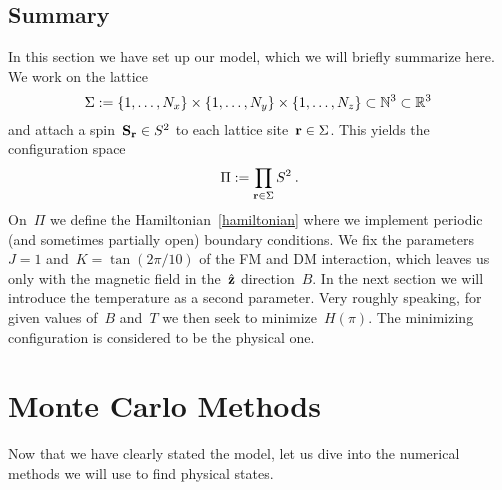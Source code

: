 \subsection{Summary}

In this section we have set up our model, which we will briefly summarize here.
We work on the lattice
%
\begin{equation}
  \Sigma := \{1,\dots,N_x\} \times \{1,\dots,N_y\} \times
  \{1,\dots,N_z\} \subset \mathbb{N}^3 \subset \mathbb{R}^3\:
\end{equation}
%
and attach a spin~$\mathbf{S}_{\mathbf{r}} \in S^2$ to each lattice site~$\mathbf{r} \in \Sigma$. This
yields the configuration space
%
\begin{equation}
  \Pi := \prod_{\mathbf{r} \in \Sigma} S^2\:.
\end{equation}
%
On~$\Pi$ we define the Hamiltonian~\eqref{hamiltonian} where we implement
periodic (and sometimes partially open) boundary conditions. We fix the
parameters~$J=1$ and~$K=\tan(2\pi / 10)$ of the FM and DM interaction, which
leaves us only with the magnetic field in the~$\hat{\mathbf{z}}$ direction~$B$. In the next
section we will introduce the temperature as a second parameter. Very
roughly speaking, for given values of~$B$ and~$T$ we then seek to
minimize~$H(\pi)$. The minimizing configuration is considered to be the physical
one.


%
\section{Monte Carlo Methods}\label{sec:mctheory}
%
Now that we have clearly stated the model, let us dive into the numerical
methods we will use to find physical states.



\begin{figure}
  \centering
  \caption{}
\label{fig:interact}
\end{figure}
